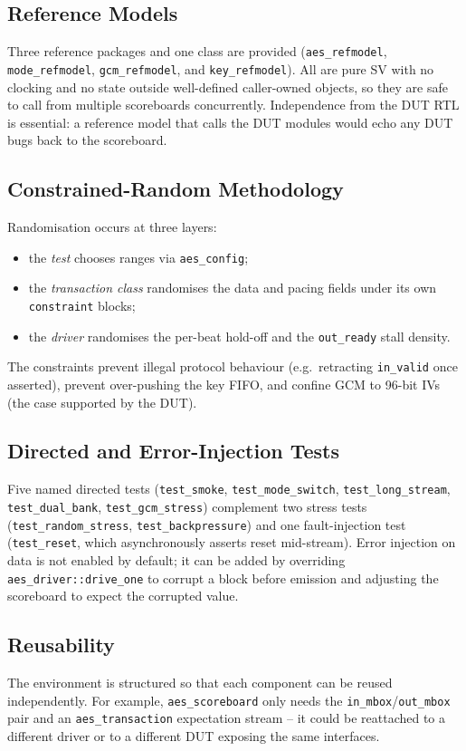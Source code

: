 \documentclass[conference,10pt,a4paper]{IEEEtran}
\begin{document}
\subsection{Reference Models}
Three reference packages and one class are provided
(\texttt{aes\_refmodel}, \texttt{mode\_refmodel}, \texttt{gcm\_refmodel},
and \texttt{key\_refmodel}).  All are pure SV with no clocking and no
state outside well-defined caller-owned objects, so they are safe to
call from multiple scoreboards concurrently.  Independence from the DUT
RTL is essential: a reference model that calls the DUT modules would
echo any DUT bugs back to the scoreboard.

\subsection{Constrained-Random Methodology}
Randomisation occurs at three layers:
\begin{itemize}[leftmargin=*]
  \item the \emph{test} chooses ranges via \texttt{aes\_config};
  \item the \emph{transaction class} randomises the data and pacing
        fields under its own \texttt{constraint} blocks;
  \item the \emph{driver} randomises the per-beat hold-off and the
        \texttt{out\_ready} stall density.
\end{itemize}
The constraints prevent illegal protocol behaviour (e.g.\ retracting
\texttt{in\_valid} once asserted), prevent over-pushing the key FIFO,
and confine GCM to 96-bit IVs (the case supported by the DUT).

\subsection{Directed and Error-Injection Tests}
Five named directed tests (\texttt{test\_smoke},
\texttt{test\_mode\_switch}, \texttt{test\_long\_stream},
\texttt{test\_dual\_bank}, \texttt{test\_gcm\_stress}) complement two
stress tests (\texttt{test\_random\_stress},
\texttt{test\_backpressure}) and one fault-injection test
(\texttt{test\_reset}, which asynchronously asserts reset mid-stream).
Error injection on data is not enabled by default; it can be added by
overriding \texttt{aes\_driver::drive\_one} to corrupt a block before
emission and adjusting the scoreboard to expect the corrupted value.

\subsection{Reusability}
The environment is structured so that each component can be reused
independently.  For example, \texttt{aes\_scoreboard} only needs the
\texttt{in\_mbox}/\texttt{out\_mbox} pair and an \texttt{aes\_transaction}
expectation stream -- it could be reattached to a different driver or to
a different DUT exposing the same interfaces.
\end{document}
